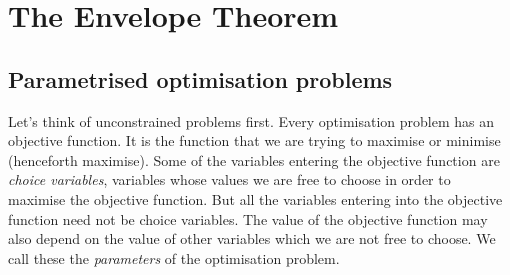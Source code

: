 \documentclass[11pt,reqno,openany]{amsbook}
\begin{document}
\chapter{The Envelope Theorem}
\section{Parametrised optimisation problems}
Let's think of unconstrained problems first. Every optimisation
problem has an objective function. It is the function that we are
trying to maximise or minimise (henceforth maximise). Some of the variables entering the
objective function are \emph{choice variables}, variables whose values
we are free to choose in order to maximise the objective function. But
all the variables entering into the objective function need not be
choice variables. The value of the objective function may also depend
on the value of other variables which we are not free to choose. We
call these the \emph{parameters} of the optimisation problem. 
\end{document}
